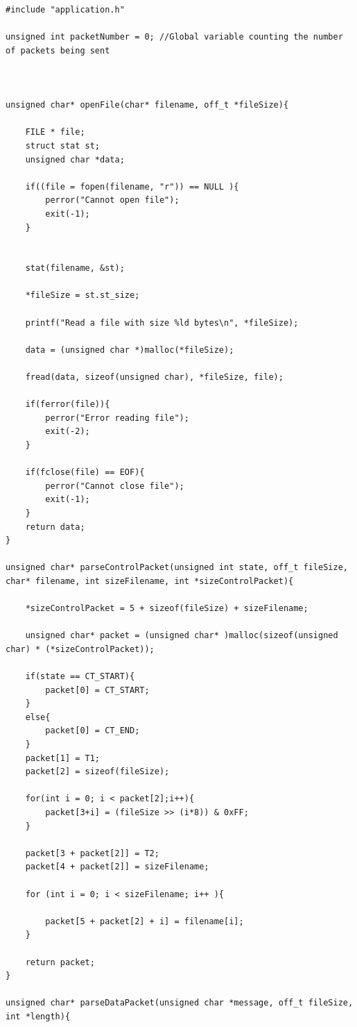 \documentclass{article}
\begin{document}
\begin{lstlisting}[style=CStyle]
#include "application.h"

unsigned int packetNumber = 0; //Global variable counting the number of packets being sent



unsigned char* openFile(char* filename, off_t *fileSize){

    FILE * file;
    struct stat st;
    unsigned char *data;
    
    if((file = fopen(filename, "r")) == NULL ){
        perror("Cannot open file");
        exit(-1);
    }


    stat(filename, &st);
    
    *fileSize = st.st_size;

    printf("Read a file with size %ld bytes\n", *fileSize);

    data = (unsigned char *)malloc(*fileSize);

    fread(data, sizeof(unsigned char), *fileSize, file);

    if(ferror(file)){
        perror("Error reading file");
        exit(-2);
    }

    if(fclose(file) == EOF){
        perror("Cannot close file");
        exit(-1);
    }
    return data;
}

unsigned char* parseControlPacket(unsigned int state, off_t fileSize, char* filename, int sizeFilename, int *sizeControlPacket){
    
    *sizeControlPacket = 5 + sizeof(fileSize) + sizeFilename;

    unsigned char* packet = (unsigned char* )malloc(sizeof(unsigned char) * (*sizeControlPacket));

    if(state == CT_START){
        packet[0] = CT_START;
    }
    else{
        packet[0] = CT_END;
    }
    packet[1] = T1;
    packet[2] = sizeof(fileSize);
    
    for(int i = 0; i < packet[2];i++){
        packet[3+i] = (fileSize >> (i*8)) & 0xFF;
    }

    packet[3 + packet[2]] = T2;
    packet[4 + packet[2]] = sizeFilename;

    for (int i = 0; i < sizeFilename; i++ ){
        
        packet[5 + packet[2] + i] = filename[i];
    }

    return packet;
}

unsigned char* parseDataPacket(unsigned char *message, off_t fileSize, int *length){
    

\end{lstlisting}
\end{document}
